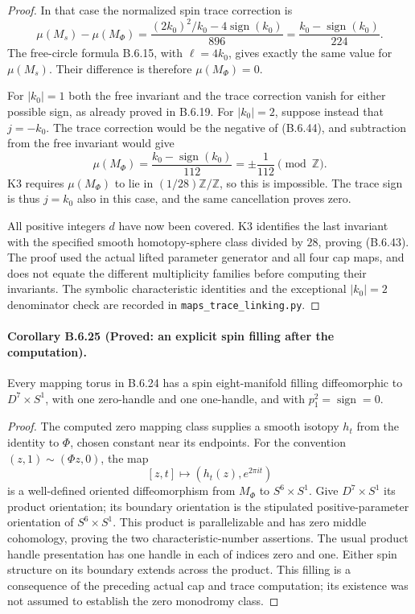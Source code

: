\begin{proof}
In that case the normalized spin trace correction is
\[
 \mu(M_s)-\mu(M_\Phi)
 =\frac{(2k_0)^2/k_0-4\operatorname{sign}(k_0)}{896}
 =\frac{k_0-\operatorname{sign}(k_0)}{224}.
 \tag{B.6.44}
\]
The free-circle formula B.6.15, with $\ell=4k_0$, gives
exactly the same value for $\mu(M_s)$.  Their difference
is therefore $\mu(M_\Phi)=0$.

For $|k_0|=1$ both the free invariant and the trace
correction vanish for either possible sign, as already
proved in B.6.19.  For $|k_0|=2$, suppose instead that
$j=-k_0$.  The trace correction would be the negative
of (B.6.44), and subtraction from the free invariant
would give
\[
 \mu(M_\Phi)=\frac{k_0-\operatorname{sign}(k_0)}{112}
                         =\pm\frac1{112}\pmod{\mathbb Z}.
\]
K3 requires $\mu(M_\Phi)$ to lie in
$(1/28)\mathbb Z/\mathbb Z$, so this is impossible.
The trace sign is thus $j=k_0$ also in this case,
and the same cancellation proves zero.

All positive integers $d$ have now been covered.  K3
identifies the last invariant with the specified smooth
homotopy-sphere class divided by $28$, proving
(B.6.43).  The proof used the actual lifted parameter
generator and all four cap maps, and does not equate
the different multiplicity families before computing
their invariants.  The symbolic characteristic identities
and the exceptional $|k_0|=2$ denominator check are
recorded in \texttt{maps\_trace\_linking.py}.
\end{proof}

\paragraph{Corollary B.6.25 (Proved: an explicit spin filling after the computation).}
Every mapping torus in B.6.24 has a spin eight-manifold
filling diffeomorphic to $D^7\times S^1$, with one
zero-handle and one one-handle, and with
$p_1^2=\operatorname{sign}=0$.
\begin{proof}
The computed zero mapping class supplies a smooth
isotopy $h_t$ from the identity to $\Phi$, chosen
constant near its endpoints.  For the convention
$(z,1)\sim(\Phi z,0)$, the map
\[
 [z,t]\longmapsto(h_t(z),e^{2\pi it})
\]
is a well-defined oriented diffeomorphism from
$M_\Phi$ to $S^6\times S^1$.  Give $D^7\times S^1$
its product orientation; its boundary orientation is
the stipulated positive-parameter orientation of
$S^6\times S^1$.  This product is parallelizable and
has zero middle cohomology, proving the two
characteristic-number assertions.  The usual product
handle presentation has one handle in each of
indices zero and one.  Either spin structure on its
boundary extends across the product.  This filling
is a consequence of the preceding actual cap and
trace computation; its existence was not assumed
to establish the zero monodromy class.
\end{proof}
